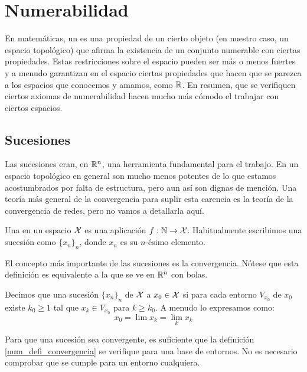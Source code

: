 \chapter{Numerabilidad}
\label{num}

En matemáticas, un  es una propiedad de un cierto objeto (en nuestro caso, un espacio topológico) que afirma la existencia de un conjunto numerable con ciertas propiedades. Estas restricciones sobre el espacio pueden ser más o menos fuertes y a menudo garantizan en el espacio ciertas propiedades que hacen que se parezca a los espacios que conocemos y amamos, como $\mathbb{R}$. En resumen, que se verifiquen ciertos axiomas de numerabilidad hacen mucho más cómodo el trabajar con ciertos espacios.

\section{Sucesiones}

Las sucesiones eran, en $\mathbb{R}^n$, una herramienta fundamental para el trabajo. En un espacio topológico en general son mucho menos potentes de lo que estamos acostumbrados por falta de estructura, pero aun así son dignas de mención. Una teoría más general de la convergencia para suplir esta carencia es la teoría de la convergencia de redes, pero no vamos a detallarla aquí. 

\begin{defi}[Sucesión]
	Una  en un espacio $\mathcal{X}$ es una aplicación $f:\mathbb{N}\to \mathcal{X}$. Habitualmente escribimos una sucesión como $\{x_n\}_n$, donde $x_n$ es su $n$-ésimo elemento. 
\end{defi}

El concepto más importante de las sucesiones es la convergencia. Nótese que esta definición es equivalente a la que se ve en $\mathbb{R}^n$ con bolas.

\begin{defi}[Convergencia]
	\label{num_defi_convergencia}
	Decimos que una sucesión $\{x_n\}_n$ de $\mathcal{X}$  a $x_0\in \mathcal{X}$ si para cada entorno $V_{x_0}$ de $x_0$ existe $k_0\geq 1$ tal que $x_k\in V_{x_0}$ para $k\geq k_0$. A menudo lo expresamos como:
	\[x_0=\lim x_k = \lim_k x_k\]
\end{defi}

\begin{obs}
	Para que una sucesión sea convergente, es suficiente que la definición \ref{num_defi_convergencia} se verifique para una base de entornos. No es necesario comprobar que se cumple para un entorno cualquiera.
\end{obs}

